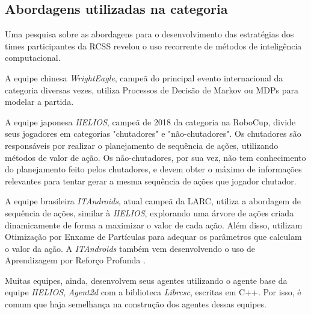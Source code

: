 \subsection{Abordagens utilizadas na categoria}
\par Uma pesquisa sobre as abordagens para o desenvolvimento das estratégias dos times participantes da RCSS revelou o uso recorrente de métodos de inteligência computacional.
\par A equipe chinesa \textit{WrightEagle}, campeã do principal evento internacional da categoria diversas vezes, utiliza Processos de Decisão de Markov ou MDPs para modelar a partida\cite{bai2015online}.
\par A equipe japonesa \textit{HELIOS}, campeã de 2018 da categoria na RoboCup, divide seus jogadores em categorias "chutadores" e "não-chutadores".
Os chutadores são responsáveis por realizar o planejamento de sequência de ações, utilizando métodos de valor de ação.
Os não-chutadores, por sua vez, não tem conhecimento do planejamento feito pelos chutadores, e devem obter o máximo de informações relevantes para tentar gerar a mesma sequência de ações que jogador chutador\cite{nakashima2018helios2018}.
\par A equipe brasileira \textit{ITAndroids}, atual campeã da LARC, utiliza a abordagem de sequência de ações, similar à \textit{HELIOS}, explorando uma árvore de ações criada dinamicamente de forma a maximizar o valor de cada ação. Além disso, utilizam Otimização por Enxame de Partículas \cite{melloitandroids} para adequar os parâmetros que calculam o valor da ação. A \textit{ITAndroids} também vem desenvolvendo o uso de Aprendizagem por Reforço Profunda \cite{maximoitandroids}.
\par Muitas equipes, ainda, desenvolvem seus agentes utilizando o agente base da equipe \textit{HELIOS}, \textit{Agent2d} com a biblioteca \textit{Librcsc}, escritas em C++. Por isso, é comum que haja semelhança na construção dos agentes dessas equipes.
